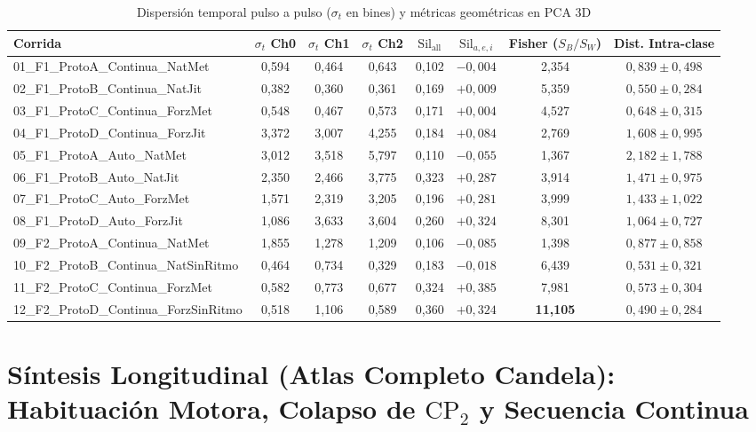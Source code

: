 \documentclass[11pt,a4paper]{article}
\begin{document}
\begin{table}[h!]
\centering
\caption{Dispersi\'on temporal pulso a pulso ($\sigma_t$ en bines) y m\'etricas geom\'etricas en PCA 3D}
\label{tab:varianza}
\scriptsize
\begin{tabular}{lccccccc}
\toprule
\textbf{Corrida} & \textbf{$\sigma_t$ Ch0} & \textbf{$\sigma_t$ Ch1} & \textbf{$\sigma_t$ Ch2} & \textbf{$\text{Sil}_{\text{all}}$} & \textbf{$\text{Sil}_{a,e,i}$} & \textbf{Fisher ($S_B/S_W$)} & \textbf{Dist. Intra-clase} \\
\midrule
01\_F1\_ProtoA\_Continua\_NatMet & 0,594 & 0,464 & 0,643 & 0,102 & $-0{,}004$ & 2,354 & $0{,}839 \pm 0{,}498$ \\
02\_F1\_ProtoB\_Continua\_NatJit & 0,382 & 0,360 & 0,361 & 0,169 & $+0{,}009$ & 5,359 & $0{,}550 \pm 0{,}284$ \\
03\_F1\_ProtoC\_Continua\_ForzMet & 0,548 & 0,467 & 0,573 & 0,171 & $+0{,}004$ & 4,527 & $0{,}648 \pm 0{,}315$ \\
04\_F1\_ProtoD\_Continua\_ForzJit & 3,372 & 3,007 & 4,255 & 0,184 & $+0{,}084$ & 2,769 & $1{,}608 \pm 0{,}995$ \\
05\_F1\_ProtoA\_Auto\_NatMet & 3,012 & 3,518 & 5,797 & 0,110 & $-0{,}055$ & 1,367 & $2{,}182 \pm 1{,}788$ \\
06\_F1\_ProtoB\_Auto\_NatJit & 2,350 & 2,466 & 3,775 & 0,323 & $+0{,}287$ & 3,914 & $1{,}471 \pm 0{,}975$ \\
07\_F1\_ProtoC\_Auto\_ForzMet & 1,571 & 2,319 & 3,205 & 0,196 & $+0{,}281$ & 3,999 & $1{,}433 \pm 1{,}022$ \\
08\_F1\_ProtoD\_Auto\_ForzJit & 1,086 & 3,633 & 3,604 & 0,260 & $+0{,}324$ & 8,301 & $1{,}064 \pm 0{,}727$ \\
09\_F2\_ProtoA\_Continua\_NatMet & 1,855 & 1,278 & 1,209 & 0,106 & $-0{,}085$ & 1,398 & $0{,}877 \pm 0{,}858$ \\
10\_F2\_ProtoB\_Continua\_NatSinRitmo & 0,464 & 0,734 & 0,329 & 0,183 & $-0{,}018$ & 6,439 & $0{,}531 \pm 0{,}321$ \\
11\_F2\_ProtoC\_Continua\_ForzMet & 0,582 & 0,773 & 0,677 & 0,324 & $+0{,}385$ & 7,981 & $0{,}573 \pm 0{,}304$ \\
12\_F2\_ProtoD\_Continua\_ForzSinRitmo & 0,518 & 1,106 & 0,589 & 0,360 & $+0{,}324$ & \textbf{11,105} & $0{,}490 \pm 0{,}284$ \\
\bottomrule
\end{tabular}
\end{table}

\section{S\'intesis Longitudinal (Atlas Completo Candela): Habituaci\'on Motora, Colapso de $\text{CP}_2$ y Secuencia Continua}
\end{document}

